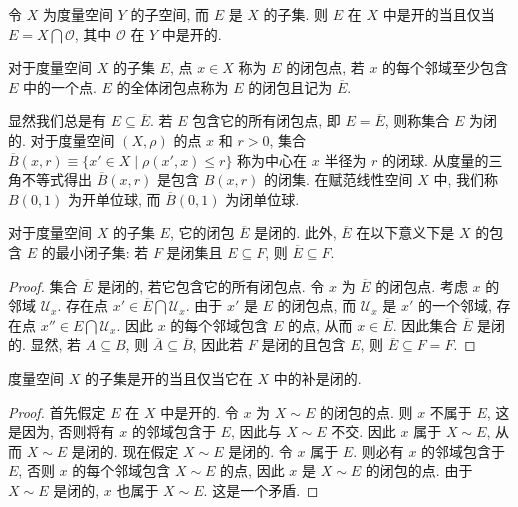 \documentclass[../../main.tex]{subfiles}
\begin{document}
\begin{proposition}\label{proposition:ch09-子空间开集}
令 $X$ 为度量空间 $Y$ 的子空间, 而 $E$ 是 $X$ 的子集. 则 $E$ 在 $X$ 中是开的当且仅当 $E=X\bigcap\mathcal{O}$, 其中 $\mathcal{O}$ 在 $Y$ 中是开的.
\end{proposition}

\begin{definition}[闭包点与闭包]\label{definition:ch09-闭包点闭包}
对于度量空间 $X$ 的子集 $E$, 点 $x\in X$ 称为 $E$ 的闭包点, 若 $x$ 的每个邻域至少包含 $E$ 中的一个点. $E$ 的全体闭包点称为 $E$ 的闭包且记为 $\overline{E}$.
\end{definition}

显然我们总是有 $E\subseteq\overline{E}$. 若 $E$ 包含它的所有闭包点, 即 $E=\overline{E}$, 则称集合 $E$ 为闭的. 对于度量空间 $(X,\rho)$ 的点 $x$ 和 $r>0$, 集合 $\overline{B}(x,r)\equiv\{x'\in X\mid\rho(x',x)\leqslant r\}$ 称为中心在 $x$ 半径为 $r$ 的闭球. 从度量的三角不等式得出 $\overline{B}(x,r)$ 是包含 $B(x,r)$ 的闭集. 在赋范线性空间 $X$ 中, 我们称 $B(0,1)$ 为开单位球, 而 $\overline{B}(0,1)$ 为闭单位球.

\begin{proposition}\label{proposition:ch09-闭包最小闭集}
对于度量空间 $X$ 的子集 $E$, 它的闭包 $\overline{E}$ 是闭的. 此外, $\overline{E}$ 在以下意义下是 $X$ 的包含 $E$ 的最小闭子集: 若 $F$ 是闭集且 $E\subseteq F$, 则 $\overline{E}\subseteq F$.
\end{proposition}

\begin{proof}
集合 $\overline{E}$ 是闭的, 若它包含它的所有闭包点. 令 $x$ 为 $\overline{E}$ 的闭包点. 考虑 $x$ 的邻域 $\mathcal{U}_{x}$. 存在点 $x'\in\overline{E}\bigcap\mathcal{U}_{x}$. 由于 $x'$ 是 $E$ 的闭包点, 而 $\mathcal{U}_{x}$ 是 $x'$ 的一个邻域, 存在点 $x''\in E\bigcap\mathcal{U}_{x}$. 因此 $x$ 的每个邻域包含 $E$ 的点, 从而 $x\in\overline{E}$. 因此集合 $\overline{E}$ 是闭的. 显然, 若 $A\subseteq B$, 则 $\overline{A}\subseteq\overline{B}$, 因此若 $F$ 是闭的且包含 $E$, 则 $\overline{E}\subseteq F=F$.
\end{proof}

\begin{proposition}\label{proposition:ch09-开集补集闭集}
度量空间 $X$ 的子集是开的当且仅当它在 $X$ 中的补是闭的.
\end{proposition}

\begin{proof}
首先假定 $E$ 在 $X$ 中是开的. 令 $x$ 为 $X\sim E$ 的闭包的点. 则 $x$ 不属于 $E$, 这是因为, 否则将有 $x$ 的邻域包含于 $E$, 因此与 $X\sim E$ 不交. 因此 $x$ 属于 $X\sim E$, 从而 $X\sim E$ 是闭的. 现在假定 $X\sim E$ 是闭的. 令 $x$ 属于 $E$. 则必有 $x$ 的邻域包含于 $E$, 否则 $x$ 的每个邻域包含 $X\sim E$ 的点, 因此 $x$ 是 $X\sim E$ 的闭包的点. 由于 $X\sim E$ 是闭的, $x$ 也属于 $X\sim E$. 这是一个矛盾.
\end{proof}
\end{document}
